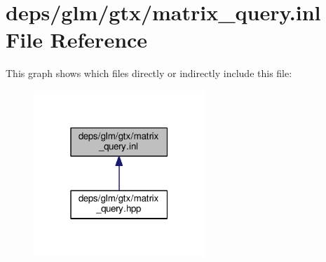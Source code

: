\hypertarget{matrix__query_8inl}{}\section{deps/glm/gtx/matrix\+\_\+query.inl File Reference}
\label{matrix__query_8inl}
This graph shows which files directly or indirectly include this file\+:
\nopagebreak
\begin{figure}[H]
\begin{center}
\leavevmode
\includegraphics[width=183pt]{d5/dff/matrix__query_8inl__dep__incl}
\end{center}
\end{figure}
